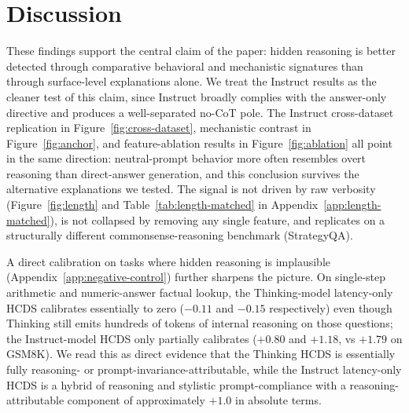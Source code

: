 \documentclass{article}
\theoremstyle{plain}
\theoremstyle{definition}
\theoremstyle{remark}
\begin{document}
\section{Discussion}
\label{sec:discussion}

These findings support the central claim of the paper: hidden reasoning is better detected through comparative behavioral and mechanistic signatures than through surface-level explanations alone. We treat the Instruct results as the cleaner test of this claim, since Instruct broadly complies with the answer-only directive and produces a well-separated no-CoT pole. The Instruct cross-dataset replication in Figure~\ref{fig:cross-dataset}, mechanistic contrast in Figure~\ref{fig:anchor}, and feature-ablation results in Figure~\ref{fig:ablation} all point in the same direction: neutral-prompt behavior more often resembles overt reasoning than direct-answer generation, and this conclusion survives the alternative explanations we tested. The signal is not driven by raw verbosity (Figure~\ref{fig:length} and Table~\ref{tab:length-matched} in Appendix~\ref{app:length-matched}), is not collapsed by removing any single feature, and replicates on a structurally different commonsense-reasoning benchmark (StrategyQA).

A direct calibration on tasks where hidden reasoning is implausible (Appendix~\ref{app:negative-control}) further sharpens the picture. On single-step arithmetic and numeric-answer factual lookup, the Thinking-model latency-only HCDS calibrates essentially to zero ($-0.11$ and $-0.15$ respectively) even though Thinking still emits hundreds of tokens of internal reasoning on those questions; the Instruct-model HCDS only partially calibrates ($+0.80$ and $+1.18$, vs $+1.79$ on GSM8K). We read this as direct evidence that the Thinking HCDS is essentially fully reasoning- or prompt-invariance-attributable, while the Instruct latency-only HCDS is a hybrid of reasoning and stylistic prompt-compliance with a reasoning-attributable component of approximately $+1.0$ in absolute terms.
\end{document}
